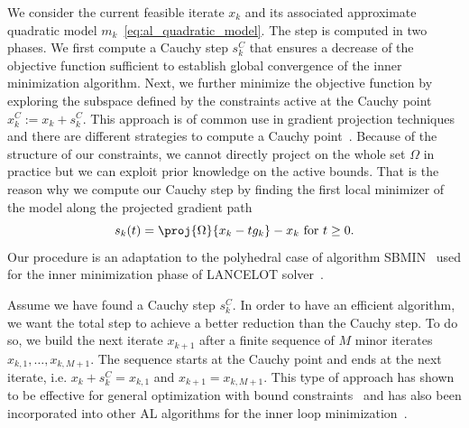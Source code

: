 We consider the current feasible iterate $x_k$ and its associated approximate quadratic model $m_k$~\eqref{eq:al_quadratic_model}. The step is computed in two phases. We first compute a Cauchy step $s_k^C$ that ensures a decrease of the objective function sufficient to establish global convergence of the inner minimization algorithm. Next, we further minimize the objective function by exploring the subspace defined by the constraints active at the Cauchy point $x_k^C:=x_k+s_k^C$. This approach is of common use in gradient projection techniques~\cite[Chapter 16]{nocedalwright:2006} and there are different strategies to compute a Cauchy point~\cite{conn-etal:1988b,moretoraldo:1991,linmore:1999a}. Because of the structure of our constraints, we cannot directly project on the whole set $\Omega$ in practice but we can exploit prior knowledge on the active bounds. That is the reason why we compute our Cauchy step by finding the first local minimizer of the model along the projected gradient path
\begin{equation}\label{eq:projected_gradient_path}
	s_k(t)=\proj{\Omega}{x_k-tg_k}-x_k \text{ for } t\ge 0.
\end{equation}
Our procedure is an adaptation to the polyhedral case of algorithm SBMIN~\cite{conn-etal:1988b} used for the inner minimization phase of LANCELOT solver~\cite{conn-etal:1992}. 

Assume we have found a Cauchy step $s_k^C$. In order to have an efficient algorithm, we want the total step to achieve a better reduction than the Cauchy step. To do so, we build the next iterate $x_{k+1}$ after a finite sequence of $M$ minor iterates $x_{k,1},\ldots,x_{k,M+1}$. The sequence starts at the Cauchy point and ends at the next iterate, i.e. $x_{k}+s_k^C=x_{k,1}$ and $x_{k+1}=x_{k,M+1}$. This type of approach has shown to be effective for general optimization with bound constraints~\cite{linmore:1999a} and has also been incorporated into other AL algorithms for the inner loop minimization~\cite{conn-etal:1992,arreckx-etal:2016}.

